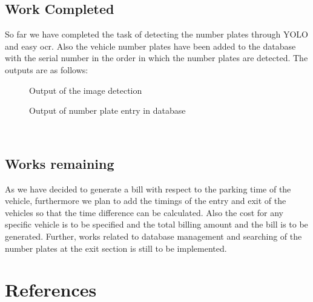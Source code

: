 \section{Work Completed}
So far we have completed the task of detecting the number plates through YOLO and easy ocr. Also the vehicle number plates have been added to the database with the serial number in the order in which the  number plates are detected.
The outputs are as follows:
\begin{figure}[h!]
    \centering
    \caption{Output of the image detection}
    \label{fig:my_label}
\end{figure}
\begin{figure}[h!]
    \caption{Output of number plate entry in database}
    \label{fig:my_label}
\end{figure}
\\
\section{Works remaining}
As we have decided to generate a bill with respect to the parking time of the vehicle, furthermore we plan to add the timings of the entry and exit of the vehicles so that the time difference can be calculated. Also the cost for any specific vehicle is to be specified and the total billing amount and the bill is to be generated. Further, works related to database management and searching of the number plates at the exit section is still to be implemented.
\newpage
\renewcommand\bibname{References} %



\chapter*{References}

	

